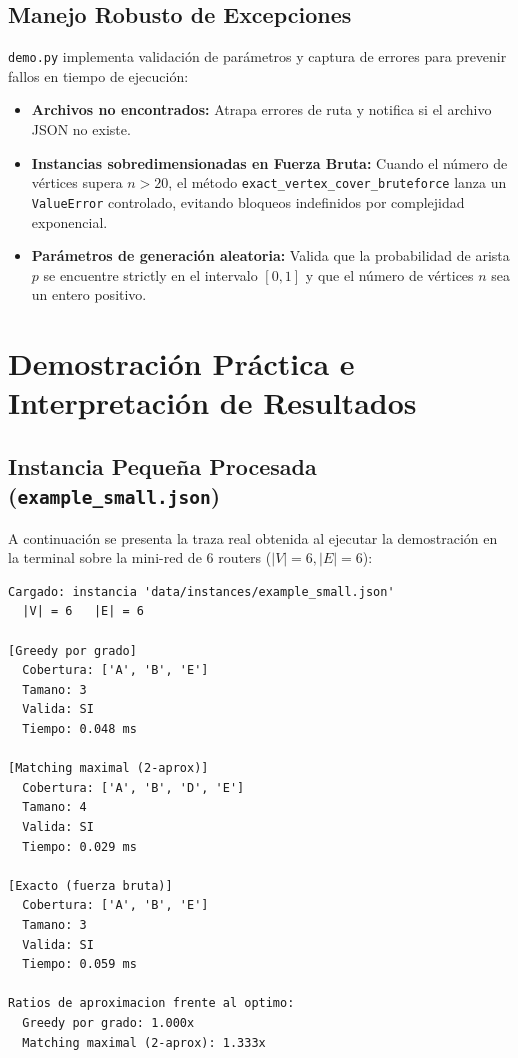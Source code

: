 \documentclass[11pt,a4paper]{article}
\begin{document}
\subsection{Manejo Robusto de Excepciones}
\texttt{demo.py} implementa validación de parámetros y captura de errores para prevenir fallos en tiempo de ejecución:
\begin{itemize}[leftmargin=*]
    \item \textbf{Archivos no encontrados:} Atrapa errores de ruta y notifica si el archivo JSON no existe.
    \item \textbf{Instancias sobredimensionadas en Fuerza Bruta:} Cuando el número de vértices supera $n > 20$, el método \texttt{exact\_vertex\_cover\_bruteforce} lanza un \texttt{ValueError} controlado, evitando bloqueos indefinidos por complejidad exponencial.
    \item \textbf{Parámetros de generación aleatoria:} Valida que la probabilidad de arista $p$ se encuentre strictly en el intervalo $[0, 1]$ y que el número de vértices $n$ sea un entero positivo.
\end{itemize}

\section{Demostración Práctica e Interpretación de Resultados}

\subsection{Instancia Pequeña Procesada (\texttt{example\_small.json})}
A continuación se presenta la traza real obtenida al ejecutar la demostración en la terminal sobre la mini-red de 6 routers ($|V|=6, |E|=6$):

\begin{lstlisting}
Cargado: instancia 'data/instances/example_small.json'
  |V| = 6   |E| = 6

[Greedy por grado]
  Cobertura: ['A', 'B', 'E']
  Tamano: 3
  Valida: SI
  Tiempo: 0.048 ms

[Matching maximal (2-aprox)]
  Cobertura: ['A', 'B', 'D', 'E']
  Tamano: 4
  Valida: SI
  Tiempo: 0.029 ms

[Exacto (fuerza bruta)]
  Cobertura: ['A', 'B', 'E']
  Tamano: 3
  Valida: SI
  Tiempo: 0.059 ms

Ratios de aproximacion frente al optimo:
  Greedy por grado: 1.000x
  Matching maximal (2-aprox): 1.333x
\end{lstlisting}
\end{document}

